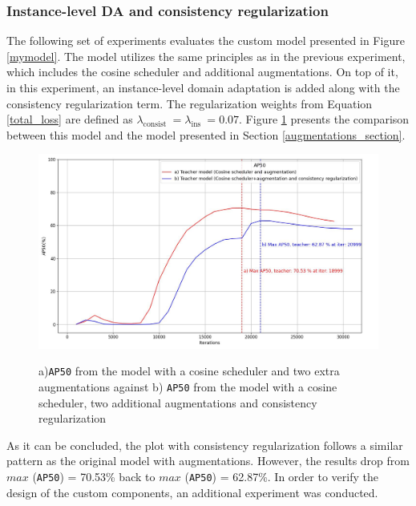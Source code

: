 \subsubsection{Instance-level DA and consistency regularization}
The following set of experiments evaluates the custom model presented in Figure \ref{mymodel}. The model utilizes the same principles as in the previous experiment, which includes the cosine scheduler and additional augmentations. On top of it, in this experiment, an instance-level domain adaptation is added along with the consistency regularization term. The regularization weights from Equation \ref{total_loss} are defined as $\lambda_{\text {consist }} = \lambda_{\text {ins }} = 0.07$. Figure \ref{myModel_experiment} presents the comparison between this model and the model presented in Section \ref{augmentations_section}.

\begin{figure}[htb]
	\begin{center}
		\includegraphics[width=14cm]{./AP50_Augm_consistency.jpg}
	\end{center}
	\caption{a)\texttt{AP50} from the model with a cosine  scheduler and two extra augmentations against b) \texttt{AP50} from the model with a cosine scheduler, two additional augmentations and consistency regularization}
	\begin{center}
		\label{myModel_experiment}
	\end{center}
\end{figure}
\FloatBarrier  

As it can be concluded, the plot with consistency regularization follows a similar pattern as the original model with augmentations. However, the results drop from $max$ (\texttt{AP50}) = 70.53\% back to  $max$ (\texttt{AP50}) = 62.87\%. In order to verify the design of the custom components, an additional experiment was conducted. 

